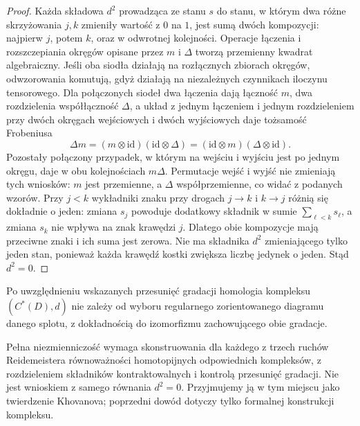 \begin{proof}
Każda składowa $d^2$ prowadząca ze stanu $s$ do stanu,
w którym dwa różne skrzyżowania $j,k$ zmieniły wartość
z $0$ na $1$, jest sumą dwóch kompozycji: najpierw $j$,
potem $k$, oraz w odwrotnej kolejności. Operacje
łączenia i rozszczepiania okręgów opisane przez $m$
i $\Delta$ tworzą przemienny kwadrat algebraiczny.
Jeśli oba siodła działają na rozłącznych
zbiorach okręgów, odwzorowania komutują,
gdyż działają na niezależnych czynnikach
iloczynu tensorowego. Dla połączonych siodeł
dwa łączenia dają łączność $m$, dwa rozdzielenia
współłączność $\Delta$, a układ z jednym
łączeniem i jednym rozdzieleniem przy dwóch
okręgach wejściowych i dwóch wyjściowych
daje tożsamość Frobeniusa
\[
\Delta m=(m\otimes\mathrm{id})(\mathrm{id}\otimes\Delta)
=(\mathrm{id}\otimes m)(\Delta\otimes\mathrm{id}).
\]
Pozostały połączony przypadek, w którym
na wejściu i wyjściu jest po jednym okręgu,
daje w obu kolejnościach $m\Delta$.
Permutacje wejść i wyjść nie zmieniają tych
wniosków: $m$ jest przemienne, a $\Delta$
współprzemienne, co widać z podanych wzorów.
Przy $j<k$ wykładniki znaku przy drogach $j\to k$
i $k\to j$ różnią się dokładnie o jeden: zmiana $s_j$
powoduje dodatkowy składnik w sumie $\sum_{\ell<k}s_\ell$,
a zmiana $s_k$ nie wpływa na znak krawędzi $j$.
Dlatego obie kompozycje mają przeciwne znaki
i ich suma jest zerowa. Nie ma składnika $d^2$
zmieniającego tylko jeden stan, ponieważ każda krawędź
kostki zwiększa liczbę jedynek o jeden. Stąd $d^2=0$.
\end{proof}

\begin{twierdzenie}
Po uwzględnieniu wskazanych przesunięć gradacji
homologia kompleksu $(C^*(D),d)$ nie zależy od wyboru
regularnego zorientowanego diagramu danego splotu,
z dokładnością do izomorfizmu zachowującego obie gradacje.
\end{twierdzenie}

\begin{uwaga}
Pełna niezmienniczość wymaga skonstruowania dla każdego
z trzech ruchów Reidemeistera równoważności homotopijnych
odpowiednich kompleksów, z rozdzieleniem składników
kontraktowalnych i kontrolą przesunięć gradacji.
Nie jest wnioskiem z samego równania $d^2=0$.
Przyjmujemy ją w tym miejscu jako twierdzenie Khovanova;
poprzedni dowód dotyczy tylko formalnej konstrukcji kompleksu.
\end{uwaga}

